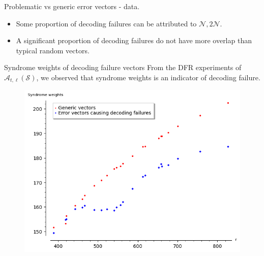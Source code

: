 \begin{frame}{Problematic vs generic error vectors - data.}
\begin{itemize}
\item Some proportion of decoding failures can be attributed to $\mathcal{N}, 2\mathcal{N}$.
\item A significant proportion of decoding failures do not have more overlap than typical random vectors.
\end{itemize}
\end{frame}

\begin{frame}{Syndrome weights of decoding failure vectors}
    From the DFR experiments of $\mathcal{A}_{t,\ell}(\mathcal{S})$, we observed that syndrome weights is an indicator of decoding failure.
    
    \begin{figure}
        \centering
        \includegraphics[scale=0.6]{Images/average_sw_generic_vs_DF_T3.png}
    \end{figure}
\end{frame}

